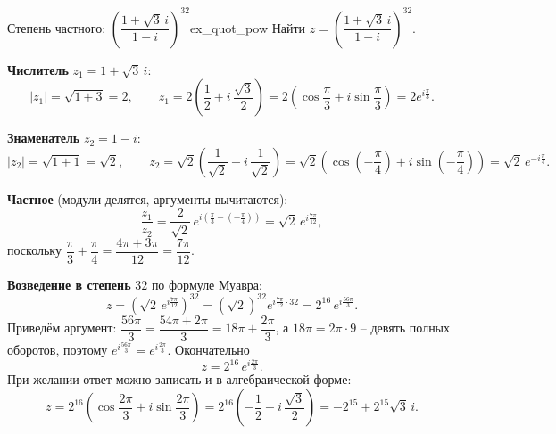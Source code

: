 \documentclass[12pt,a4paper]{article}
\begin{document}
\begin{definition}{Степень частного:
$\left(\dfrac{1+\sqrt3\,i}{1-i}\right)^{32}$}{ex_quot_pow}
Найти $z = \left(\dfrac{1 + \sqrt{3}\,i}{1 - i}\right)^{32}$.

\textbf{Числитель} $z_1 = 1 + \sqrt{3}\,i$:
\[
|z_1| = \sqrt{1 + 3} = 2, \qquad
z_1 = 2\!\left(\frac{1}{2} + i\,\frac{\sqrt{3}}{2}\right)
= 2\!\left(\cos\frac{\pi}{3} + i\sin\frac{\pi}{3}\right)
= 2e^{i\frac{\pi}{3}}.
\]

\textbf{Знаменатель} $z_2 = 1 - i$:
\[
|z_2| = \sqrt{1 + 1} = \sqrt{2}, \qquad
z_2 = \sqrt{2}\!\left(\frac{1}{\sqrt{2}} - i\,\frac{1}{\sqrt{2}}\right)
= \sqrt{2}\!\left(\cos\!\left(-\frac{\pi}{4}\right)
+ i\sin\!\left(-\frac{\pi}{4}\right)\right)
= \sqrt{2}\,e^{-i\frac{\pi}{4}}.
\]

\textbf{Частное} (модули делятся, аргументы вычитаются):
\[
\frac{z_1}{z_2} = \frac{2}{\sqrt{2}}\,
e^{i\left(\frac{\pi}{3} - \left(-\frac{\pi}{4}\right)\right)}
= \sqrt{2}\,e^{i\frac{7\pi}{12}},
\]
поскольку $\dfrac{\pi}{3} + \dfrac{\pi}{4}
= \dfrac{4\pi + 3\pi}{12} = \dfrac{7\pi}{12}$.

\textbf{Возведение в степень} $32$ по формуле Муавра:
\[
z = \left(\sqrt{2}\,e^{i\frac{7\pi}{12}}\right)^{32}
= \left(\sqrt{2}\right)^{32} e^{i\frac{7\pi}{12}\cdot 32}
= 2^{16}\, e^{i\frac{56\pi}{3}}.
\]
Приведём аргумент: $\dfrac{56\pi}{3} = \dfrac{54\pi + 2\pi}{3}
= 18\pi + \dfrac{2\pi}{3}$, а $18\pi = 2\pi\cdot 9$ -- девять полных
оборотов, поэтому $e^{i\frac{56\pi}{3}} = e^{i\frac{2\pi}{3}}$.
Окончательно
\[
z = 2^{16}\, e^{i\frac{2\pi}{3}}.
\]
При желании ответ можно записать и в алгебраической форме:
\[
z = 2^{16}\!\left(\cos\frac{2\pi}{3} + i\sin\frac{2\pi}{3}\right)
= 2^{16}\!\left(-\frac{1}{2} + i\,\frac{\sqrt{3}}{2}\right)
= -2^{15} + 2^{15}\sqrt{3}\,i.
\]
\end{definition}
\end{document}
